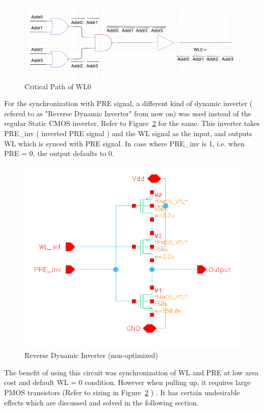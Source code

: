 \documentclass[10pt,letterpaper,onecolumn]{article}
\begin{document}
\begin{figure}[h!]
\centering
\includegraphics[scale=0.6]{CriticalPath.png}
\caption{Critical Path of WL0}
\label{fig:CriticalPath}
\end{figure}

For the synchronization with PRE signal, a different kind of dynamic inverter ( refered to as "Reverse Dynamic Inverter" from now on) was used instead of the regular Static CMOS inverter. Refer to Figure~\ref{fig:RevDynamic} for the same. This inverter takes PRE\_inv ( inverted PRE signal ) and the WL signal as the input, and outputs WL which is synced with PRE signal. In case where PRE\_inv is 1, i.e. when PRE = 0, the output defaults to 0. 

\begin{figure}[h!]
\centering
\includegraphics[scale=0.6]{RevDynamic.png}
\caption{Reverse Dynamic Inverter (non-optimized) }
\label{fig:RevDynamic}
\end{figure}

The benefit of using this circuit was synchronization of WL and PRE at low area cost and default WL = 0 condition. However when pulling up, it requires large PMOS transistors (Refer to sizing in Figure~\ref{fig:RevDynamic} ) . It has certain undesirable effects which are discussed and solved in the following section. 
\end{document}
